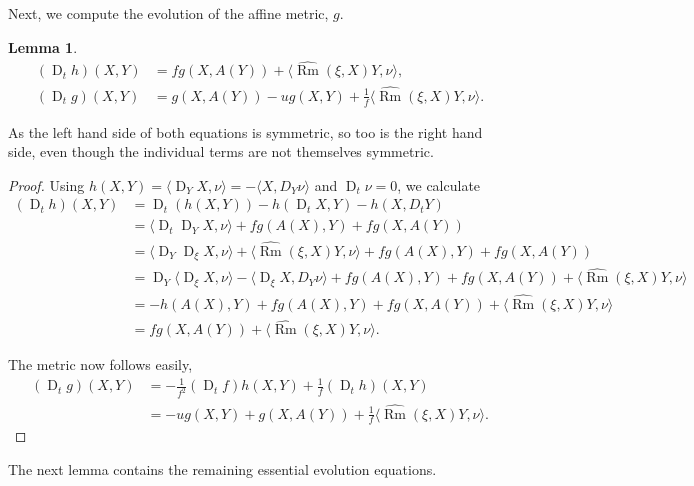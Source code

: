 \documentclass{amsart}
\newtheorem{lemma}[theorem]{Lemma}
\theoremstyle{definition}
\theoremstyle{remark}
\newcommand{\ip}[2]{\ensuremath{\langle{#1},{#2}\rangle}}
\DeclareMathOperator{\Rm}{Rm}
\DeclareMathOperator{\D}{D}
\numberwithin{equation}{section}
\begin{document}
Next, we compute the evolution of the affine metric, $g$.

\begin{lemma}
\label{lem:metric}
\begin{align*}
(\D_t h) (X, Y) &= f g(X, A(Y)) + \ip{\widehat{\Rm}(\xi, X) Y}{\nu}, \\
(\D_t g) (X, Y) &= g(X, A(Y)) - u g(X, Y) + \frac{1}{f} \ip{\widehat{\Rm}(\xi, X) Y}{\nu}.
\end{align*}
\end{lemma}

As the left hand side of both equations is symmetric, so too is the right hand side, even though the individual terms are not themselves symmetric.

\begin{proof}
Using $h(X,Y) = \ip{\D_Y X}{\nu} = -\ip{X}{D_Y \nu}$ and $\D_t\nu = 0$, we calculate
\[
\begin{split}
(\D_t h) (X, Y) &= \D_t (h(X, Y)) - h(\D_t X, Y) - h(X, D_t Y) \\
&= \ip{\D_t \D_Y X}{\nu} + f g(A(X), Y) + f g(X, A(Y)) \\
&= \ip{\D_Y \D_{\xi} X}{\nu} + \ip{\widehat{\Rm}(\xi, X) Y}{\nu} + f g(A(X), Y) + f g(X, A(Y))\\
&= \D_Y \ip{\D_{\xi} X}{\nu} - \ip{\D_{\xi} X}{D_Y \nu} + f g(A(X), Y) + f g(X, A(Y)) + \ip{\widehat{\Rm}(\xi, X) Y}{\nu} \\
&= - h(A(X), Y) + f g(A(X), Y) + f g(X, A(Y)) + \ip{\widehat{\Rm}(\xi, X) Y}{\nu} \\
&= fg(X, A(Y)) + \ip{\widehat{\Rm}(\xi, X) Y}{\nu}.
\end{split}
\]

The metric now follows easily,
\[
\begin{split}
(\D_t g) (X, Y) &= -\frac{1}{f^2} (\D_t f) h(X, Y) + \frac{1}{f} (\D_t h) (X, Y) \\
&= -u g(X, Y) + g(X, A(Y)) + \frac{1}{f} \ip{\widehat{\Rm}(\xi, X) Y}{\nu}.
\end{split}
\]
\end{proof}

The next lemma contains the remaining essential evolution equations.
\end{document}
